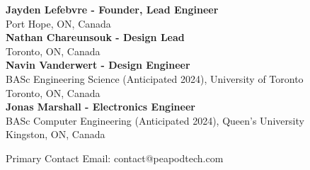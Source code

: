 \small{
    \textbf{Jayden Lefebvre - Founder, Lead Engineer}\\
    Port Hope, ON, Canada\\
    \vspace{.5cm}
    \textbf{Nathan Chareunsouk - Design Lead}\\Toronto, ON, Canada\\
    \vspace{.5cm}
    \textbf{Navin Vanderwert - Design Engineer}\\
    BASc Engineering Science (Anticipated 2024), University of Toronto\\
    Toronto, ON, Canada\\
    \vspace{.5cm}
    \textbf{Jonas Marshall - Electronics Engineer}\\
    BASc Computer Engineering (Anticipated 2024), Queen's University\\
    Kingston, ON, Canada
}

\vspace{1cm}

Primary Contact Email: contact@peapodtech.com